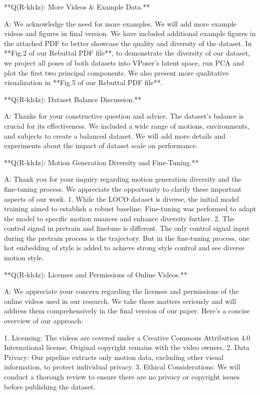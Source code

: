 **Q(R-kh4z): More Videos \& Example Data.**

A: We acknowledge the need for more examples. We will add more example videos and figures in final version. We have included additional example figures in the attached PDF to better showcase the quality and diversity of the dataset. In **Fig.2 of our Rebuttal PDF file**, to demonstrate the diversity of our dataset, we project all poses of both datasets into VPoser’s latent space, run PCA and plot the first two principal components. We also present more qualitative visualization in **Fig.5 of our Rebuttal PDF file**.

**Q(R-kh4z): Dataset Balance Discussion.**

A: Thanks for your constructive question and advice. The dataset's balance is crucial for its effectiveness. We included a wide range of motions, environments, and subjects to create a balanced dataset. We will add more details and experiments about the impact of dataset scale on performance. 

**Q(R-kh4z): Motion Generation Diversity and Fine-Tuning.**

A: Thank you for your inquiry regarding motion generation diversity and the fine-tuning process. We appreciate the opportunity to clarify these important aspects of our work.
1. While the LOCO dataset is diverse, the initial model training aimed to establish a robust baseline. Fine-tuning was performed to adapt the model to specific motion nuances and enhance diversity further. 
2. The control signal in pretrain and finetune is different. The only control signal input during the pretrain process is the trajectory. But in the fine-tuning process, one hot embedding of style is added to achieve strong style control and see diverse motion style.

**Q(R-kh4z): Licenses and Permissions of Online Videos.**

A: We appreciate your concern regarding the licenses and permissions of the online videos used in our research. We take these matters seriously and will address them comprehensively in the final version of our paper. Here's a concise overview of our approach:

1. Licensing: The videos are covered under a Creative Commons Attribution 4.0 International license. Original copyright remains with the video owners.
2. Data Privacy: Our pipeline extracts only motion data, excluding other visual information, to protect individual privacy.
3. Ethical Considerations: We will conduct a thorough review to ensure there are no privacy or copyright issues before publishing the dataset.

